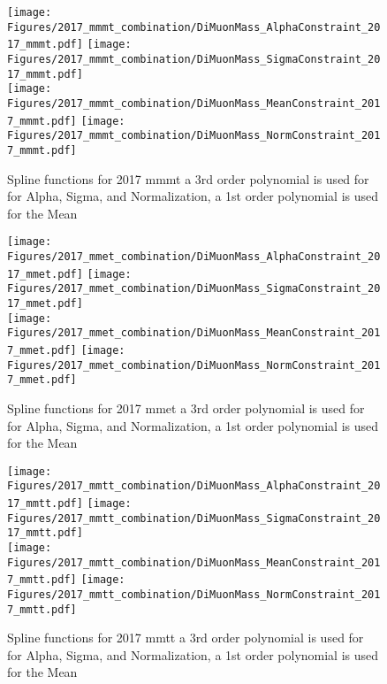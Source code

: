 \begin{figure}[ht!b]
    \centering 
    \texttt{[image: Figures/2017\_mmmt\_combination/DiMuonMass\_AlphaConstraint\_2017\_mmmt.pdf]}
    \texttt{[image: Figures/2017\_mmmt\_combination/DiMuonMass\_SigmaConstraint\_2017\_mmmt.pdf]}\\
    \texttt{[image: Figures/2017\_mmmt\_combination/DiMuonMass\_MeanConstraint\_2017\_mmmt.pdf]}
    \texttt{[image: Figures/2017\_mmmt\_combination/DiMuonMass\_NormConstraint\_2017\_mmmt.pdf]}\\
    \caption{\label{fig:spline_2017_mmmt} Spline functions for 2017 mmmt a 3rd order polynomial is used for  for Alpha, Sigma, and Normalization, a 1st order polynomial is used for the Mean}
\end{figure}
\begin{figure}[ht!b]
    \centering 
    \texttt{[image: Figures/2017\_mmet\_combination/DiMuonMass\_AlphaConstraint\_2017\_mmet.pdf]}
    \texttt{[image: Figures/2017\_mmet\_combination/DiMuonMass\_SigmaConstraint\_2017\_mmet.pdf]}\\
    \texttt{[image: Figures/2017\_mmet\_combination/DiMuonMass\_MeanConstraint\_2017\_mmet.pdf]}
    \texttt{[image: Figures/2017\_mmet\_combination/DiMuonMass\_NormConstraint\_2017\_mmet.pdf]}\\
    \caption{\label{fig:spline_2017_mmet} Spline functions for 2017 mmet a 3rd order polynomial is used for  for Alpha, Sigma, and Normalization, a 1st order polynomial is used for the Mean}
\end{figure}
\begin{figure}[ht!b]
    \centering 
    \texttt{[image: Figures/2017\_mmtt\_combination/DiMuonMass\_AlphaConstraint\_2017\_mmtt.pdf]}
    \texttt{[image: Figures/2017\_mmtt\_combination/DiMuonMass\_SigmaConstraint\_2017\_mmtt.pdf]}\\
    \texttt{[image: Figures/2017\_mmtt\_combination/DiMuonMass\_MeanConstraint\_2017\_mmtt.pdf]}
    \texttt{[image: Figures/2017\_mmtt\_combination/DiMuonMass\_NormConstraint\_2017\_mmtt.pdf]}\\
    \caption{\label{fig:spline_2017_mmtt} Spline functions for 2017 mmtt a 3rd order polynomial is used for  for Alpha, Sigma, and Normalization, a 1st order polynomial is used for the Mean}
\end{figure}
